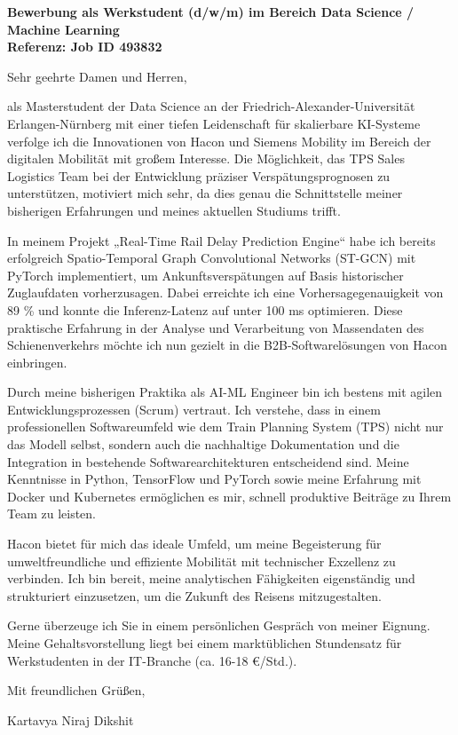 \documentclass[10pt, a4paper]{article}
\begin{document}
\vspace{20pt}
\noindent \textbf{Bewerbung als Werkstudent (d/w/m) im Bereich Data Science / Machine Learning} \\
\textbf{Referenz: Job ID 493832}

\vspace{20pt}
Sehr geehrte Damen und Herren,

als Masterstudent der Data Science an der Friedrich-Alexander-Universität Erlangen-Nürnberg mit einer tiefen Leidenschaft für skalierbare KI-Systeme verfolge ich die Innovationen von Hacon und Siemens Mobility im Bereich der digitalen Mobilität mit großem Interesse. Die Möglichkeit, das TPS Sales Logistics Team bei der Entwicklung präziser Verspätungsprognosen zu unterstützen, motiviert mich sehr, da dies genau die Schnittstelle meiner bisherigen Erfahrungen und meines aktuellen Studiums trifft.

In meinem Projekt „Real-Time Rail Delay Prediction Engine“ habe ich bereits erfolgreich Spatio-Temporal Graph Convolutional Networks (ST-GCN) mit PyTorch implementiert, um Ankunftsverspätungen auf Basis historischer Zuglaufdaten vorherzusagen. Dabei erreichte ich eine Vorhersagegenauigkeit von 89 \% und konnte die Inferenz-Latenz auf unter 100 ms optimieren. Diese praktische Erfahrung in der Analyse und Verarbeitung von Massendaten des Schienenverkehrs möchte ich nun gezielt in die B2B-Softwarelösungen von Hacon einbringen.

Durch meine bisherigen Praktika als AI-ML Engineer bin ich bestens mit agilen Entwicklungsprozessen (Scrum) vertraut. Ich verstehe, dass in einem professionellen Softwareumfeld wie dem Train Planning System (TPS) nicht nur das Modell selbst, sondern auch die nachhaltige Dokumentation und die Integration in bestehende Softwarearchitekturen entscheidend sind. Meine Kenntnisse in Python, TensorFlow und PyTorch sowie meine Erfahrung mit Docker und Kubernetes ermöglichen es mir, schnell produktive Beiträge zu Ihrem Team zu leisten.

Hacon bietet für mich das ideale Umfeld, um meine Begeisterung für umweltfreundliche und effiziente Mobilität mit technischer Exzellenz zu verbinden. Ich bin bereit, meine analytischen Fähigkeiten eigenständig und strukturiert einzusetzen, um die Zukunft des Reisens mitzugestalten.

Gerne überzeuge ich Sie in einem persönlichen Gespräch von meiner Eignung. Meine Gehaltsvorstellung liegt bei einem marktüblichen Stundensatz für Werkstudenten in der IT-Branche (ca. 16-18 €/Std.).

\vspace{20pt}
Mit freundlichen Grüßen,

\vspace{10pt}
Kartavya Niraj Dikshit
\end{document}
